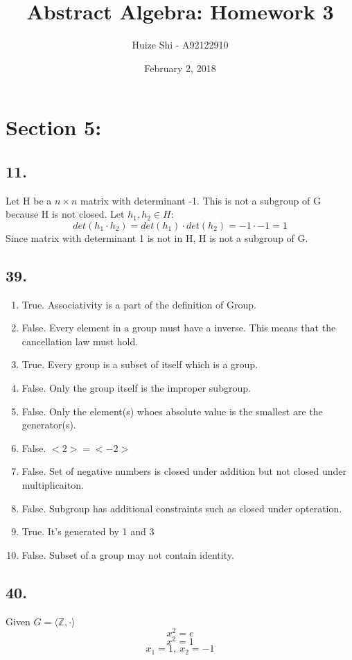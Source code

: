 \documentclass{article}
\title{Abstract Algebra: Homework 3}
\author{Huize Shi - A92122910}
\date {February 2, 2018}
\begin{document}
\maketitle

\section*{Section 5: }
\subsection*{11. }
	Let H be a $n\times n$ matrix with determinant -1. This is not a subgroup of G
because H is not closed. Let $h_1, h_2 \in H$:
	$$det(h_1 \cdot h_2) = det(h_1) \cdot det(h_2)=-1 \cdot -1 =1$$
	Since matrix with determinant 1 is not in H, H is not a subgroup of G.
	
\subsection*{39. }
	\begin{enumerate}[label=\textbf{\alph*}.]
		\item True. Associativity is a part of the definition of Group.
		\item False. Every element in a group must have a inverse. This means that the
		cancellation law must hold.
		\item True. Every group is a subset of itself which is a group.
		\item False. Only the group itself is the improper subgroup.
		\item False. Only the element(s) whoes absolute value is the smallest are the
			generator(s).
		\item False. $<2> = <-2>$
		\item False. Set of negative numbers is closed under addition but not closed
			under multiplicaiton.
		\item False. Subgroup has additional constraints such as closed under
			opteration.
		\item True. It's generated by 1 and 3
		\item False. Subset of a group may not contain identity.
	\end{enumerate}

\subsection*{40. }
Given $G = \langle\mathbb{Z}, \cdot\rangle$
$$x^2 = e$$
$$x^2 = 1$$
$$x_1 = 1,\ x_2 = -1$$
\end{document}
